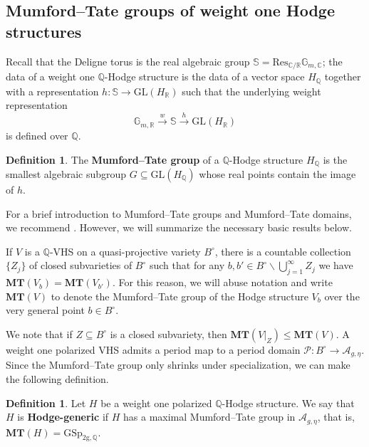 \documentclass[12pt]{amsart}
\newcommand{\R}{\mathbb{R}}
\newcommand{\Q}{\mathbb{Q}}
\newcommand{\C}{\mathbb{C}}
\newcommand{\cP}{\mathcal{P}}
\newcommand{\cA}{\mathcal{A}}
\newcommand{\GL}{\mathrm{GL}}
\theoremstyle{definition}
\newtheorem{definition}[theorem]{Definition}
\numberwithin{equation}{section}
\begin{document}
\subsection{Mumford--Tate groups of weight one Hodge structures}

Recall that the Deligne torus is the real algebraic group 
\(\mathbb{S} = \mathrm{Res}_{\C/\R} \mathbb{G}_{m, \C}\); the data of a 
weight one \(\Q\)-Hodge structure is the data of a vector space 
\(H_\Q\) together with a representation \(h: \mathbb{S} \to \GL(H_\R)\) 
such that the underlying weight representation 
\begin{equation*}
    \mathbb{G}_{m, \R} \xrightarrow{w} \mathbb{S} \xrightarrow{h} \GL(H_\R)
\end{equation*}
is defined over \(\Q\).

\begin{definition}
    The {\bf Mumford--Tate group} of a \(\Q\)-Hodge structure \(H_\Q\) is the 
    smallest algebraic subgroup \(G \subseteq \GL(H_\Q)\) whose real points
    contain the image of \(h\).
\end{definition}

For a brief introduction to Mumford--Tate groups and Mumford--Tate domains, we 
recommend \cite[Chapter 15]{CMP}. However, we will summarize the necessary basic 
results below.

If \(V\) is a \(\Q\)-VHS on a quasi-projective variety \(B^\circ\), there is 
a countable collection \(\{Z_j\}\) of closed subvarieties of \(B^\circ\) such that 
for any \(b, b' \in B^\circ \smallsetminus \bigcup_{j=1}^\infty Z_j\) 
we have \(\mathbf{MT}(V_b) = \mathbf{MT}(V_{b'})\). For this reason, we will abuse 
notation and write \(\mathbf{MT}(V)\) to denote the Mumford--Tate group of the 
Hodge structure \(V_b\) over the very general point \(b \in B^\circ\).

We note that if \(Z \subseteq B^\circ\) is a closed subvariety, then 
\(\mathbf{MT}(V|_Z) \leq \mathbf{MT}(V)\). A weight one polarized VHS admits a period map 
to a period domain \(\cP: B^\circ \to \cA_{g, \eta}\). Since the Mumford--Tate 
group only shrinks under specialization, we can make the following definition.

\begin{definition}
    Let \(H\) be a weight one polarized \(\Q\)-Hodge structure. We say that \(H\) is 
    {\bf Hodge-generic} if \(H\) has a maximal Mumford--Tate group in \(\cA_{g, \eta}\),
    that is, \(\mathbf{MT}(H) = \mathrm{GSp_{2g, \Q}}\).
\end{definition}
\end{document}
